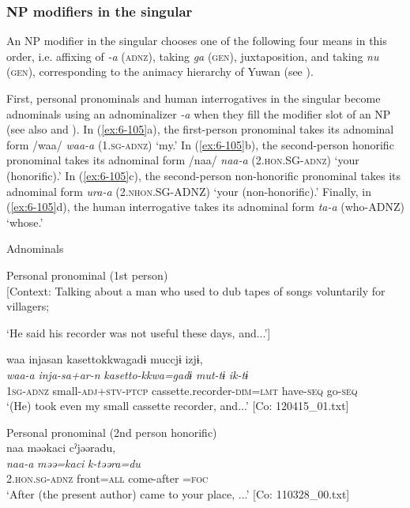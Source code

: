 \subsubsection{NP modifiers in the singular}

An NP modifier in the singular chooses one of the following four means in this order, i.e. affixing of \textit{-a} (\textsc{adnz}), taking \textit{ga} (\textsc{gen}), juxtaposition, and taking \textit{nu} (\textsc{gen}), corresponding to the animacy hierarchy of Yuwan (see ).

First, personal pronominals and human interrogatives in the singular become adnominals using an adnominalizer \textit{-a} when they fill the modifier slot of an NP (see also  and ). In (\ref{ex:6-105}a), the first-person pronominal takes its adnominal form /waa/ \textit{waa-a} (1.\textsc{sg}-\textsc{adnz}) ‘my.’ In (\ref{ex:6-105}b), the second-person honorific pronominal takes its adnominal form /naa/ \textit{naa-a} (2.\textsc{hon}.SG-\textsc{adnz}) ‘your (honorific).’ In (\ref{ex:6-105}c), the second-person non-honorific pronominal takes its adnominal form \textit{ura-a} (2.\textsc{nhon}.SG-ADNZ) ‘your (non-honorific).’ Finally, in (\ref{ex:6-105}d), the human interrogative takes its adnominal form \textit{ta-a} (who-ADNZ) ‘whose.’

\ea\label{ex:6-105}
  Adnominals

 \ea Personal pronominal (1st person)\\{}
[Context: Talking about a man who used to dub tapes of songs voluntarily for villagers;

{\TM} ‘He said his recorder was not useful these days, and...’]

{\TM}
\glll waa  injasan  {\textbar}kasetto{\textbar}kkwagadɨ      muccjɨ  izjɨ,\\
      \textit{waa-a}  \textit{inja-sa+ar-n}\textsubscript{} \textit{kasetto-kkwa=gadɨ}    \textit{mut-tɨ}  \textit{ik-tɨ}\\
      1\textsc{sg}-\textsc{adnz}  small-\textsc{adj}+\textsc{stv}-\textsc{ptcp}  cassette.recorder-\textsc{dim}=\textsc{lmt}      have-\textsc{seq}  go-\textsc{seq}\\
\glt ‘(He) took even my small cassette recorder, and...’ [Co: 120415\_01.txt]
\z

\ex Personal pronominal (2nd person honorific)\\
{\TM}
\glll  naa  məəkaci  cˀjəəradu,\\
\textit{naa-a}  \textit{məə=kaci}  \textit{k-təəra=du}\\
2.\textsc{hon}.\textsc{sg}-\textsc{adnz}  front=\textsc{all}  come-after =\textsc{foc}\\
\glt ‘After (the present author) came to your place, ...’ [Co: 110328\_00.txt]
\z

